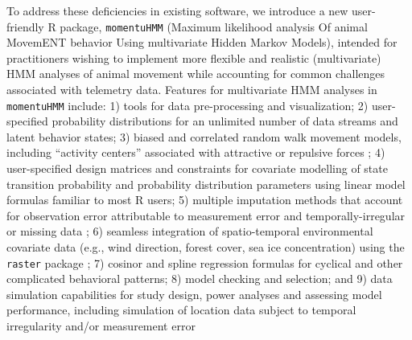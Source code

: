 \documentclass[12pt]{article}\usepackage[]{graphicx}\usepackage[]{color}
\begin{document}
To address these deficiencies in existing software, we introduce a new user-friendly R package, \verb|momentuHMM| (Maximum likelihood analysis Of animal MovemENT behavior Using multivariate Hidden Markov Models), intended for practitioners wishing to implement more flexible and realistic (multivariate) HMM analyses of animal movement while accounting for common challenges associated with telemetry data. Features for multivariate HMM analyses in \verb|momentuHMM| include: 1) tools for data pre-processing and visualization; 2) user-specified probability distributions for an unlimited number of data streams and latent behavior states; 3) biased and correlated random walk movement models, including ``activity centers'' associated with attractive or repulsive forces \citep[e.g.][]{McClintockEtAl2012}; 4) user-specified design matrices and constraints for covariate modelling of state transition probability and probability distribution parameters using linear model formulas familiar to most R users; 5) multiple imputation methods that account for observation error attributable to measurement error and temporally-irregular or missing data \citep{HootenEtAl2017,McClintock2017}; 6) seamless integration of spatio-temporal environmental covariate data (e.g., wind direction, forest cover, sea ice concentration) using the \verb|raster| package \citep{Hijmans2016}; 7) cosinor \citep[e.g.][]{Cornelissen2014} and spline regression formulas for cyclical and other complicated behavioral patterns; 8) model checking and selection; and 9) data simulation capabilities for study design, power analyses and assessing model performance, including simulation of location data subject to temporal irregularity and/or measurement error 
\end{document}
